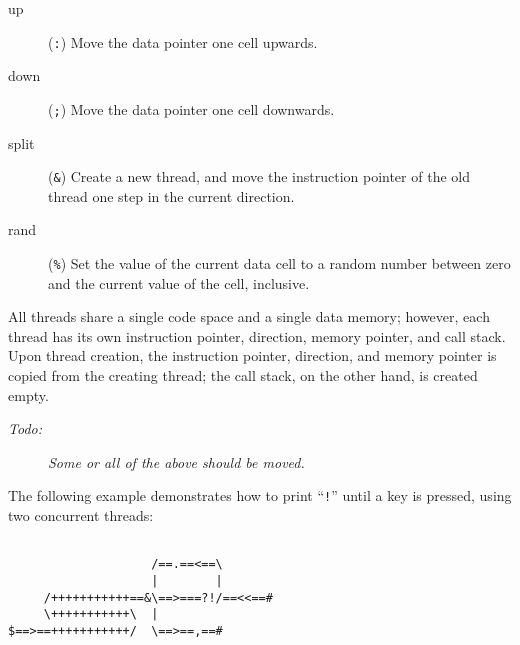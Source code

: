 \documentclass[a4paper]{article}
\newcommand\comment[2]{\begin{description} \item[#1] #2 \end{description}}
\newcommand\todo[1]{{\comment{\textit{Todo:}}{\it #1}}}
\begin{document}
\begin{description}

\item[up] (\verb":") Move the data pointer one cell upwards.

\item[down] (\verb";") Move the data pointer one cell downwards.

\item[split] (\verb"&") Create a new thread, and move the instruction pointer
of the old thread one step in the current direction.

\item[rand] (\verb"%") Set the value of the current data cell to a random
number between zero and the current value of the cell, inclusive.

\end{description}

All threads share a single code space and a single data memory; however, each
thread has its own instruction pointer, direction, memory pointer, and call
stack.  Upon thread creation, the instruction pointer, direction, and memory
pointer is copied from the creating thread; the call stack, on the other hand,
is created empty.

\todo{Some or all of the above should be moved.}

The following example demonstrates how to print ``\verb"!"'' until a key is
pressed, using two concurrent threads:

\begin{verbatim}

                    /==.==<==\       
                    |        |       
     /+++++++++++==&\==>===?!/==<<==#
     \+++++++++++\  |                
$==>==+++++++++++/  \==>==,==#       

\end{verbatim}
\end{document}
